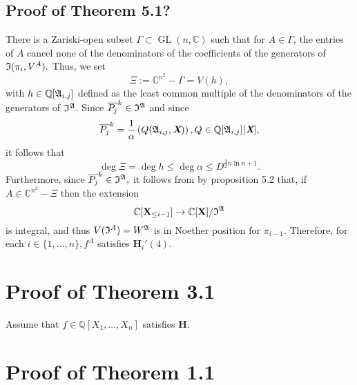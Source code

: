 \documentclass[sigconf]{acmart}
\def\Xb{\textit{\textbf{X}}}
\def\pjb{\overline{P_{j}}}
\DeclareMathOperator{\GL}{GL}
\def\C{\mathbb{C}}
\def\Q{\mathbb{Q}}
\def\I{\frak{I}}
\def\A{\frak{A}}
\begin{document}
\subsection{Proof of Theorem 5.1?}
%
There is a Zariski-open subset $\Gamma \subset \GL(n,\C)$ such that for $A \in \Gamma$, the entries of $A$ cancel none of the denominators of the coefficients of the generators of $\I(\pi_i,V^{A}).$ Thus, we set
\[
\Xi := \C^{n^2} - \Gamma = V(h),
\]
with $h \in \Q[\A_{i,j}]$ defined as the least common multiple of the denominators of the generators of $\I^\A.$ Since $\pjb^k \in \I^\A$ and since
\[
\pjb^k = \frac{1}{\alpha}\left( Q(\A_{i,j},\Xb) \right), Q \in \Q[\A_{i,j}][\Xb],
\]
it follows that 
\[
\deg \Xi = \deg h \leq \deg \alpha \leq D^{\frac{3}{2} n \ln n+1}.
\]
Furthermore, since $\pjb^k \in \I^\A,$ it follows from by proposition 5.2 that, if $A \in \C^{n^2} - \Xi$ then the extension  
\[
\C[\textbf{X}_{\leq i-1}]\rightarrow\C[\textbf{X}]/\frak{I}^\A
\]
is integral, and thus $V(\I^A)=W^\A$ is in Noether position for $\pi_{i-1}.$ Therefore, for each $i \in\{1,\hdots,n\}, f^A$ satisfies $\textbf{H}_i'(4)$.
%
%
%
%
\section{Proof of Theorem 3.1}
%
Assume that $f\in \Q[X_1,\hdots,X_n]$ satisfies $\textbf{H}.$
%
%
%
%
\section{Proof of Theorem 1.1}
%
%






\end{document}
